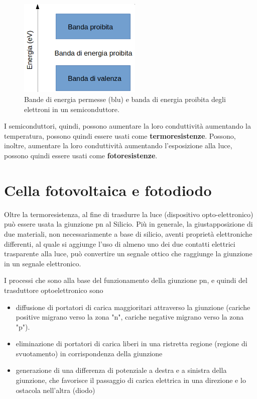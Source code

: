 \documentclass[17pt]{extarticle}
\begin{document}
\begin{figure}[b!]		
	\centering
   	\includegraphics[width=2.3in]{bandeSemiconduttore.png}%
  	\caption{Bande di energia permesse (blu) e banda di energia proibita degli elettroni in un semiconduttore.}
   	\label{fig:bandeSemiconduttore}
\end{figure}



I semiconduttori, quindi, possono aumentare la loro conduttività aumentando la temperatura, possono quindi essere usati come {\bf termoresistenze}. Possono, inoltre, aumentare la loro conduttività aumentando l'esposizione alla luce, possono quindi essere usati come {\bf fotoresistenze}. 



\section{Cella fotovoltaica e fotodiodo}

Oltre la termoresistenza, al fine di trasdurre la luce (dispositivo opto-elettronico) può essere usata la giunzione pn al Silicio. Più in generale, la giustapposizione di due materiali, non necessariamente a base di silicio, aventi proprietà elettroniche differenti, al quale si aggiunge l'uso di almeno uno dei due contatti elettrici trasparente alla luce, può convertire un segnale ottico che raggiunge la giunzione in un segnale elettronico.



I processi che sono alla base del funzionamento della giunzione pn, e quindi del trasduttore optoelettronico sono

\begin{itemize}
	\item diffusione di portatori di carica maggioritari attraverso la giunzione (cariche positive migrano verso la zona "n", cariche negative migrano verso la zona "p").
	\item eliminazione di portatori di carica liberi in una ristretta regione (regione di svuotamento) in corrispondenza della giunzione
	\item generazione di una differenza di potenziale a destra e a sinistra della giunzione, che favorisce il passaggio di carica elettrica in una direzione e lo ostacola nell'altra (diodo)
\end{itemize}
\end{document}
